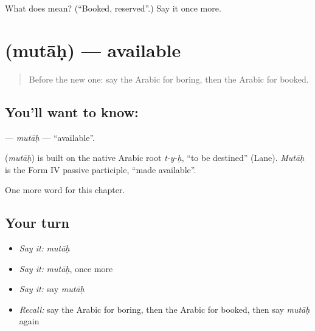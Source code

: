 \begin{tcolorbox}[breakable,colback=teal!4,colframe=teal!35!black,title={Before you move on}]
What does  mean? (\textquotedblleft{}Booked, reserved\textquotedblright{}.) Say it once more.
\end{tcolorbox}
\section[\texorpdfstring{\ar{متاح} (mutāḥ)}{متاح (mutāḥ)}]{ (mutāḥ) — available}

\label{lesson:AR-C270-mutah}



\begin{quote}
Before the new one: say the Arabic for boring, then the Arabic for booked.
\end{quote}

\subsection*{You'll want to know: }
\textbf{} — \emph{mutāḥ} — \textquotedblleft{}available\textquotedblright{}.

\begin{cousinweb}
\textbf{} (\emph{mutāḥ}) is built on the native Arabic root \emph{t-y-ḥ}, \textquotedblleft{}to be destined\textquotedblright{} (Lane). \emph{Mutāḥ} is the Form IV passive participle, \textquotedblleft{}made available\textquotedblright{}.
\end{cousinweb}

\begin{grammarlens}[title={What you've built}]
One more word for this chapter.
\end{grammarlens}

\subsection*{Your turn}
\begin{itemize}
\raggedright
  \item \emph{Say it:} \emph{mutāḥ}
  \item \emph{Say it:} \emph{mutāḥ}, once more
  \item \emph{Say it:} say \emph{mutāḥ}
  \item \emph{Recall:} say the Arabic for boring, then the Arabic for booked, then say \emph{mutāḥ} again
\end{itemize}

